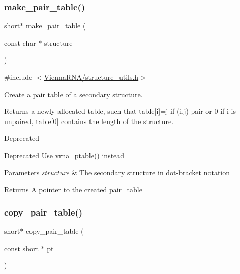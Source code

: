 \subsubsection{\texorpdfstring{make\+\_\+pair\+\_\+table()}{make\_pair\_table()}}
{\footnotesize\ttfamily short$\ast$ make\+\_\+pair\+\_\+table (\begin{DoxyParamCaption}\item[{const char $\ast$}]{structure }\end{DoxyParamCaption})}



{\ttfamily \#include $<$\hyperlink{structure__utils_8h}{Vienna\+R\+N\+A/structure\+\_\+utils.\+h}$>$}



Create a pair table of a secondary structure. 

Returns a newly allocated table, such that table\mbox{[}i\mbox{]}=j if (i.\+j) pair or 0 if i is unpaired, table\mbox{[}0\mbox{]} contains the length of the structure.

\begin{DoxyRefDesc}{Deprecated}
\item[\hyperlink{deprecated__deprecated000139}{Deprecated}]Use \hyperlink{group__struct__utils_gae829fb8bb7f694c12a9c0bbc34c77c60}{vrna\+\_\+ptable()} instead\end{DoxyRefDesc}



\begin{DoxyParams}{Parameters}
{\em structure} & The secondary structure in dot-\/bracket notation \\
\hline
\end{DoxyParams}
\begin{DoxyReturn}{Returns}
A pointer to the created pair\+\_\+table 
\end{DoxyReturn}
\mbox{\label{group__struct__utils_gafeaa6d68eef3a99d0a7aa08aa91c6601}} 
\subsubsection{\texorpdfstring{copy\+\_\+pair\+\_\+table()}{copy\_pair\_table()}}
{\footnotesize\ttfamily short$\ast$ copy\+\_\+pair\+\_\+table (\begin{DoxyParamCaption}\item[{const short $\ast$}]{pt }\end{DoxyParamCaption})}



